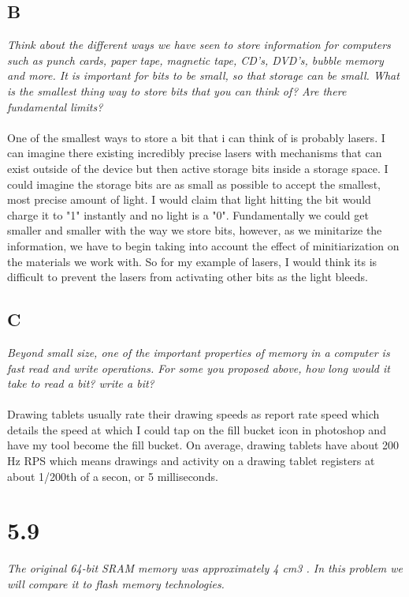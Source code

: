 \documentclass[10pt]{article}
\begin{document}
\subsection{B}
\textit{Think about the different ways we have seen to store information for computers such
as punch cards, paper tape, magnetic tape, CD’s, DVD’s, bubble memory and more.
It is important for bits to be small, so that storage can be small. What is the smallest
thing way to store bits that you can think of? Are there fundamental limits?}
\paragraph{} One of the smallest ways to store a bit that i can think of is probably lasers. I can imagine there existing incredibly precise lasers with mechanisms that can exist outside of 
the device but then active storage bits inside a storage space. I could imagine the storage bits are as small as possible to accept the smallest, most precise amount of light. I would 
claim that light hitting the bit would charge it to "1" instantly and no light is a "0". Fundamentally we could get smaller and smaller with the way we store bits, however, as we minitarize the information, we have to begin taking into account the effect of 
minitiarization on the materials we work with. So for my example of lasers, I would think its is difficult to prevent the lasers from activating other bits as the light bleeds. 
\subsection{C}
\textit{Beyond small size, one of the important properties of memory in a computer is fast
read and write operations. For some you proposed above, how long would it take to
read a bit? write a bit?}
\paragraph{}Drawing tablets usually rate their drawing speeds as report rate speed which details the speed at which I could tap on the fill bucket icon in photoshop and have my tool 
become the fill bucket. On average, drawing tablets have about 200 Hz RPS which means drawings and activity on a drawing tablet registers at about 1/200th of a secon, or 5 milliseconds. 
\section{5.9}
\textit{The original 64-bit SRAM memory was approximately 4 cm3
. In this problem we
will compare it to flash memory technologies.}
\end{document}
